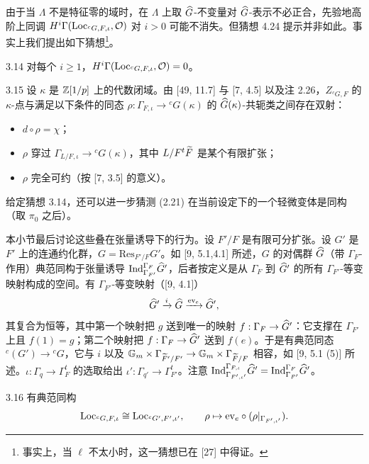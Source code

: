 由于当 $\Lambda$ 不是特征零的域时，在 $\Lambda$ 上取 $\widehat{G}$-不变量对 $\widehat{G}$-表示不必正合，先验地高阶上同调 $H^i\Gamma(\operatorname{Loc}_{{}^cG,F,\iota},\mathcal O)$ 对 $i>0$ 可能不消失。但猜想 4.24 提示并非如此。事实上我们提出如下猜想\footnote{事实上，当 $\ell$ 不太小时，这一猜想已在 [27] 中得证。}。

\begin{conj}{3.14}
对每个 $i\geq1$，$H^i\Gamma(\operatorname{Loc}_{{}^cG,F,\iota},\mathcal O)=0$。
\end{conj}

\begin{rem}{3.15}
设 $\kappa$ 是 $\mathbb{Z}[1/p]$ 上的代数闭域。由 [49, 11.7] 与 [7, 4.5] 以及注 2.26，$Z_{{}^cG,F}$ 的 $\kappa$-点与满足以下条件的同态 $\rho:\Gamma_{F,\iota}\to{}^cG(\kappa)$ 的 $\widehat{G}(\kappa)$-共轭类之间存在双射：
\begin{itemize}[leftmargin=1.6em,itemsep=0.2em]
\item $d\circ\rho=\chi$；
\item $\rho$ 穿过 $\Gamma_{L/F,\iota}\to{}^cG(\kappa)$，其中 $L/F^t\widetilde F$ 是某个有限扩张；
\item $\rho$ 完全可约（按 [7, 3.5] 的意义）。
\end{itemize}
\end{rem}

给定猜想 3.14，还可以进一步猜测 (2.21) 在当前设定下的一个轻微变体是同构（取 $\pi_0$ 之后）。

本小节最后讨论这些叠在张量诱导下的行为。设 $F'/F$ 是有限可分扩张。设 $G'$ 是 $F'$ 上的连通约化群，$G=\mathrm{Res}_{F'/F}G'$。如 [9, 5.1,4.1] 所述，$G$ 的对偶群 $\widehat{G}$（带 $\Gamma_F$-作用）典范同构于张量诱导 $\mathrm{Ind}^{\Gamma_F}_{\Gamma_{F'}}\widehat{G}'$，后者按定义是从 $\Gamma_F$ 到 $\widehat{G}'$ 的所有 $\Gamma_{F'}$-等变映射构成的空间。有 $\Gamma_{F'}$-等变映射（[9, 4.1]）
\[
\widehat{G}'\xrightarrow{i}\widehat{G}\xrightarrow{\mathrm{ev}_e}\widehat{G}',
\]
其复合为恒等，其中第一个映射把 $g$ 送到唯一的映射 $f:\Gamma_F\to\widehat{G}'$：它支撑在 $\Gamma_{F'}$ 上且 $f(1)=g$；第二个映射把 $f:\Gamma_F\to\widehat{G}'$ 送到 $f(e)$。于是有典范同态 ${}^c(G')\to{}^cG$，它与 $i$ 以及 $\mathbb G_m\times\Gamma_{\widetilde F'/F'}\to\mathbb G_m\times\Gamma_{\widetilde F/F}$ 相容，如 [9, 5.1 (5)] 所述。$\iota:\Gamma_q\to\Gamma^t_F$ 的选取给出 $\iota':\Gamma_{q'}\to\Gamma^t_{F'}$。注意 $\mathrm{Ind}^{\Gamma_{F,\iota}}_{\Gamma_{F',\iota'}}\widehat{G}'=\mathrm{Ind}^{\Gamma_F}_{\Gamma_{F'}}\widehat{G}'$。

\begin{lem}{3.16}
有典范同构
\[
\operatorname{Loc}_{{}^cG,F,\iota}\cong\operatorname{Loc}_{{}^cG',F',\iota'},\qquad \rho\mapsto \mathrm{ev}_e\circ(\rho|_{\Gamma_{F',\iota'}}).
\]
\end{lem}

